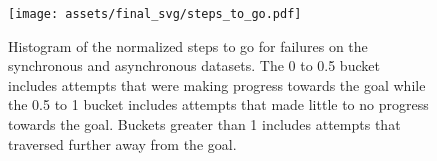 \begin{figure}[!h]
    \centering
    \texttt{[image: assets/final\_svg/steps\_to\_go.pdf]}
    \caption{Histogram of the normalized steps to go for \gptfo{} \react{} failures on the synchronous and asynchronous datasets. The 0 to 0.5 bucket includes attempts that were making progress towards the goal while the 0.5 to 1 bucket includes attempts that made little to no progress towards the goal. Buckets greater than 1 includes attempts that traversed further away from the goal.
    }
    \label{fig:histogram_steps_to_go}
\end{figure}